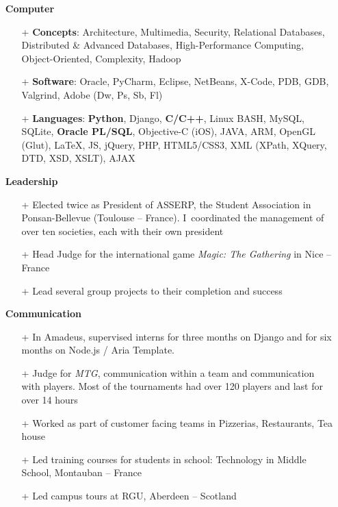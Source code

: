 \documentclass{res}
\begin{document}
\begin{resume}
        \begin{itemize}
        \item[] \textbf{Computer}
                \begin{itemize}
                  \item[+] \textbf{Concepts}: Architecture, Multimedia, Security, Relational Databases, Distributed \& Advanced Databases, High-Performance Computing, Object-Oriented, Complexity, Hadoop
                  \item[+] \textbf{Software}: Oracle, PyCharm, Eclipse, NetBeans, X-Code, PDB, GDB, Valgrind, Adobe (Dw, Ps, Sb, Fl)
                  \item[+] \textbf{Languages}: \textbf{Python}, Django, \textbf{C/C++}, Linux BASH, MySQL, SQLite, \textbf{Oracle PL/SQL}, Objective-C (iOS), JAVA, ARM, OpenGL (Glut), \LaTeX{}, JS, jQuery, PHP, HTML5/CSS3, XML (XPath, XQuery, DTD, XSD, XSLT), AJAX
                \end{itemize}
        \end{itemize}

        \begin{itemize}
        \item[] \textbf{Leadership}
                \begin{itemize}
                   \item[+] Elected twice as President of ASSERP, the Student Association in Ponsan-Bellevue (Toulouse -- France). I~coordinated the management of over ten societies, each with their own president
                  \item[+] Head Judge for the international game \textit{Magic: The Gathering} in Nice -- France
                  \item[+] Lead several group projects to their completion and success
                \end{itemize}   
        \end{itemize}
        
        \begin{itemize}
        \item[] \textbf{Communication}
            \begin{itemize}
							\item[+] In Amadeus, supervised interns for three months on Django and for six months on Node.js / Aria Template.
                \item[+] Judge for \textit{MTG}, communication within a team and communication with players. Most of the tournaments had over 120 players and last for over 14 hours
                \item[+] Worked as part of customer facing teams in Pizzerias, Restaurants, Tea house
                \item[+] Led training courses for students in school: Technology in Middle School, Montauban -- France
                \item[+]  Led campus tours at RGU, Aberdeen -- Scotland
            \end{itemize} 
        \end{itemize}
        

\end{resume}
\end{document}

